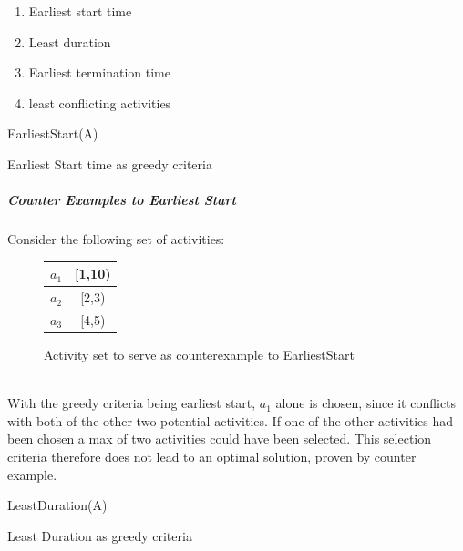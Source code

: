 \documentclass[12pt,letterpaper]{article}
\begin{document}
\begin{enumerate}
\item Earliest start time
\item Least duration
\item Earliest termination time
\item least conflicting activities
\end{enumerate}
\begin{algorithm}[h]
EarliestStart(A)
\caption{Earliest Start time as greedy criteria}
\label{Early Start Greedy}
\end{algorithm}
\subparagraph{Counter Examples to Earliest Start} Consider the following set of activities: \\
\begin{figure}[h]
\centering
\begin{tabular}{|c|c|}
\hline
$a_1$ & [1,10)\\ \hline
$a_2$ & [2,3)\\ \hline
$a_3$ & [4,5)\\ \hline
\end{tabular}
\caption{Activity set to serve as counterexample to EarliestStart}
\end{figure}\\
With the greedy criteria being earliest start, $a_1$ alone is chosen, since it conflicts with both of the other two potential activities. If one of the other activities had been chosen a max of two activities could have been selected. This selection criteria therefore does not lead to an optimal solution, proven by counter example.
\begin{algorithm}[h]
LeastDuration(A)
\caption{Least Duration as greedy criteria}
\label{Shortest Greedy}
\end{algorithm}
\end{document}

